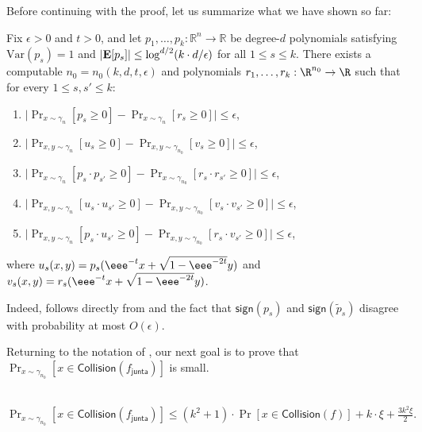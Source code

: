 \documentclass{toc}
\newcommand{\E}{{\bf E}}
\newcommand{\fh}{{f_{\mathsf{junta}}}}
\newcommand{\Var}{\mathrm{Var}}
\begin{document}
Before continuing with the proof, let us summarize what we have shown so far:
\begin{theorem}\label{thm:summary}
Fix $\epsilon > 0$ and $t > 0$, and let $p_1, \ldots, p_k: \mathbb{R}^n \rightarrow \mathbb{R}$ be degree-$d$ polynomials
satisfying $\Var(p_s) = 1$ and $|\E[p_s]| \le \log^{d/2} (k \cdot d/\epsilon)$ for 
all $1 \le s \le k$.
There exists a computable $n_0 = n_0(k, d, t, \epsilon)$
and polynomials $r_1, \dots, r_k: \R^{n_0} \to \R$ such that
for every $1 \le s, s' \le k$:
\begin{enumerate}
\item[(a)] $\big|\Pr_{x \sim \gamma_n} [{p}_s \ge 0] - \Pr_{x \sim \gamma_n} [{r}_s \ge 0]\big| \le \epsilon$,
\item[(b)] $\big|\Pr_{x,y \sim \gamma_{n}} [{u}_s \ge 0] - \Pr_{x,y \sim \gamma_{n_0}} [{v}_s \ge 0]\big| \le \epsilon$,
\item[(c)] $\big|\Pr_{x \sim \gamma_n} [{p}_s \cdot {p}_{s'} \ge 0] - 
\Pr_{x \sim \gamma_{n_0}} [{r}_s \cdot {r}_{s'} \ge 0]\big| \le \epsilon$,
\item[(d)] $\big|\Pr_{x,y \sim \gamma_n} [{u}_s\cdot {u}_{s'} \ge 0] - 
\Pr_{x,y \sim \gamma_{n_0}} [{v}_s \cdot {v}_{s'} \ge 0]\big| \le \epsilon$,
\item[(e)] $\big|\Pr_{x,y \sim \gamma_n} [{p}_s\cdot {u}_{s'} \ge 0] - 
\Pr_{x,y \sim \gamma_{n_0}} [{r}_s \cdot {v}_{s'} \ge 0]\big| \le \epsilon$,
\end{enumerate}
where $u_s(x, y) = p_s(\eee^{-t} x + \sqrt{1-\eee^{-2t}} y)$ and
$v_s(x, y) = r_s(\eee^{-t} x + \sqrt{1-\eee^{-2t}} y)$.
\end{theorem}

Indeed,  follows directly from 
and the fact that $\mathsf{sign}(p_s)$ and $\mathsf{sign}(\tilde p_s)$ disagree with probability at most $O(\epsilon)$.

Returning to the notation of , our next goal is to
prove
that $\Pr_{x \sim \gamma_{n_0}} [x \in \mathsf{Collision}(\fh)]$ is small.

\begin{claim}~\label{clm:collision-upper}
$\displaystyle \Pr_{x \sim \gamma_{n_0}} [x \in \mathsf{Collision}(\fh)]\le  (k^2+1) \cdot \Pr[x \in \mathsf{Collision}(f)] + k \cdot \xi + \frac{3k^2 \xi}{2}. $ \end{claim}
\end{document}
